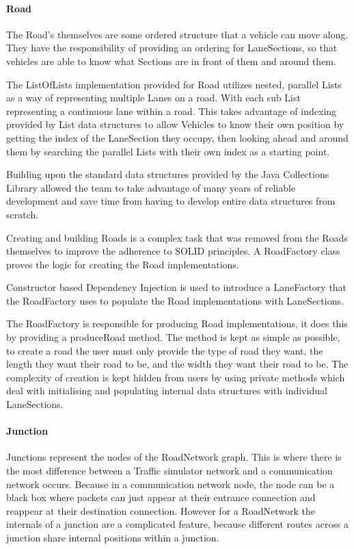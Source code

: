 \documentclass[11pt]{article}
\begin{document}
{\begin{itemize}
    \paragraph{Road}
    
    The Road's themselves are some ordered structure that a vehicle can move along. They have the responsibility of providing an ordering for LaneSections, so that vehicles are able to know what Sections are in front of them and around them.
    
    The ListOfLists implementation provided for Road utilizes nested, parallel Lists as a way of representing multiple Lanes on a road. With each sub List representing a continuous lane within a road. This takes advantage of indexing provided by List data structures to allow Vehicles to know their own position by getting the index of the LaneSection they occupy, then looking ahead and around them by searching the parallel Lists with their own index as a starting point.
    
    Building upon the standard data structures provided by the Java Collections Library allowed the team to take advantage of many years of reliable development and save time from having to develop entire data structures from scratch.
    
    Creating and building Roads is a complex task that was removed from the Roads themselves to improve the adherence to SOLID principles. A RoadFactory class proves the logic for creating the Road implementations.
    
    Constructor based Dependency Injection is used to introduce a LaneFactory that the RoadFactory uses to populate the Road implementations with LaneSections.
    
    The RoadFactory is responsible for producing Road implementations, it does this by providing a produceRoad method. The method is kept as simple as possible, to create a road the user must only provide the type of road they want, the length they want their road to be, and the width they want their road to be. The complexity of creation is kept hidden from users by using private methods which deal with initialising and populating internal data structures with individual LaneSections.

    \paragraph{Junction}
    
    Junctions represent the nodes of the RoadNetwork graph. This is where there is the most difference between a Traffic simulator network and a communication network occurs. Because in a communication network node, the node can be a black box where packets can just appear at their entrance connection and reappear at their destination connection. However for a RoadNetwork the internals of a junction are a complicated feature, because different routes across a junction share internal positions within a junction.
    

\end{itemize}}
\end{document}
